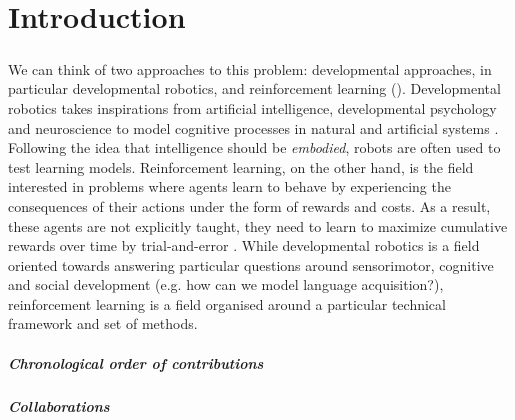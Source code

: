 
\chapter{Introduction}
\paragraph{}We can think of two approaches to this problem: developmental approaches, in particular developmental robotics, and reinforcement learning (\rl). Developmental robotics takes inspirations from artificial intelligence, developmental psychology and neuroscience to model cognitive processes in natural and artificial systems \citep{asada2009cognitive,cangelosi2015developmental}. Following the idea that intelligence should be \textit{embodied}, robots are often used to test learning models. Reinforcement learning, on the other hand, is the field interested in problems where agents learn to behave by experiencing the consequences of their actions under the form of rewards and costs. As a result, these agents are not explicitly taught, they need to learn to maximize cumulative rewards over time by trial-and-error \citep{sutton2018reinforcement}. While developmental robotics is a field oriented towards answering particular questions around sensorimotor, cognitive and social development (e.g. how can we model language acquisition?), reinforcement learning is a field organised around a particular technical framework and set of methods.

\clearpage

\paragraph{Chronological order of contributions}

\paragraph{Collaborations}


